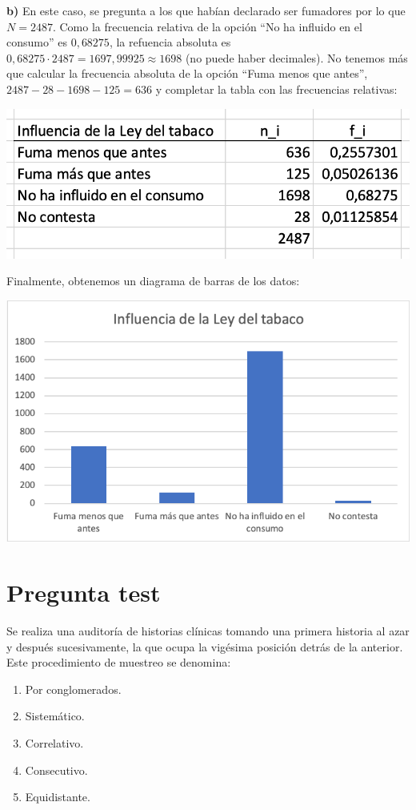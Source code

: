\documentclass[
]{book}
\providecommand{\tightlist}{%
  \setlength{\itemsep}{0pt}\setlength{\parskip}{0pt}}
\begin{document}
\textbf{b)} En este caso, se pregunta a los que habían declarado ser fumadores por lo que \(N = 2487\). Como la frecuencia relativa de la opción ``No ha influido en el consumo'' es \(0,68275\), la refuencia absoluta es \(0,68275 \cdot 2487 = 1697,99925 \approx 1698\) (no puede haber decimales). No tenemos más que calcular la frecuencia absoluta de la opción ``Fuma menos que antes'', \(2487 - 28 - 1698 - 125 = 636\) y completar la tabla con las frecuencias relativas:

\includegraphics[width=12.5in]{img/1_04}

Finalmente, obtenemos un diagrama de barras de los datos:

\includegraphics[width=10.03in]{img/1_05}

\hypertarget{pregunta-test-3}{%
\section{Pregunta test}\label{pregunta-test-3}}

Se realiza una auditoría de historias clínicas tomando una primera historia al azar y después sucesivamente, la que ocupa la vigésima posición detrás de la anterior. Este procedimiento de muestreo se denomina:

\begin{enumerate}
\def\labelenumi{\alph{enumi})}
\tightlist
\item
  Por conglomerados.
\item
  Sistemático.
\item
  Correlativo.
\item
  Consecutivo.
\item
  Equidistante.
\end{enumerate}
\end{document}

